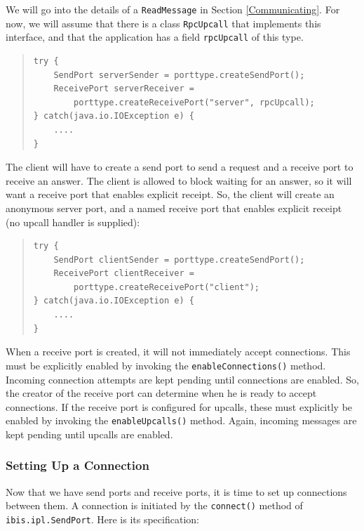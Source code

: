 \documentclass[10pt]{article}
\begin{document}
We will go into the details of a \texttt{ReadMessage} in Section
\ref{Communicating}. For now, we will assume that there is a
class \texttt{RpcUpcall} that implements this interface, and
that the application has a field \texttt{rpcUpcall} of this type.

{\small
\begin{quote}
\begin{verbatim}
try {
    SendPort serverSender = porttype.createSendPort();
    ReceivePort serverReceiver =
        porttype.createReceivePort("server", rpcUpcall);
} catch(java.io.IOException e) {
    ....
}
\end{verbatim}
\end{quote}
}

\noindent
The client will have to create a send port
to send a request and a receive port to receive an answer.
The client is allowed to block waiting for an answer, so it will
want a receive port that enables explicit receipt.
So, the client will create an anonymous server port, and a named
receive port that enables explicit receipt (no upcall handler is supplied):
{\small
\begin{quote}
\begin{verbatim}
try {
    SendPort clientSender = porttype.createSendPort();
    ReceivePort clientReceiver =
        porttype.createReceivePort("client");
} catch(java.io.IOException e) {
    ....
}
\end{verbatim}
\end{quote}
}

\noindent
When a receive port is created, it will not immediately accept connections.
This must be explicitly enabled by
invoking the \texttt{enableConnections()} method.
Incoming connection attempts are kept pending until connections are enabled.
So, the creator of
the receive port can determine when he is ready to accept connections.
If the receive port is configured for upcalls, these must
explicitly be enabled by invoking the \texttt{enableUpcalls()} method.
Again, incoming messages are kept pending until upcalls are enabled.

\subsubsection{Setting Up a Connection}

Now that we have send ports and receive ports, it is time to set up
connections between them.
A connection is initiated by the \texttt{connect()} method of
\texttt{ibis.ipl.SendPort}.
Here is its specification:
\end{document}
